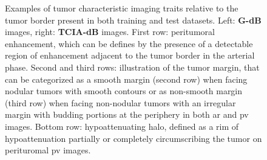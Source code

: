 \documentclass[]{article}
\newcommand{\lmttfont}[1]{{\fontfamily{lmtt}\selectfont #1}}
\begin{document}
\begin{figure}[!h]
\begin{minipage}{0.45\linewidth}
	\end{minipage}
	\caption{Examples of tumor characteristic imaging traits relative to the tumor border present in both training and test datasets. Left: \textbf{\lmttfont{G-dB}} images, right: \textbf{\lmttfont{TCIA-dB}} images. First row: peritumoral enhancement, which can be defines by the presence of a detectable region of enhancement adjacent to the tumor border in the arterial phase. Second and third rows: illustration of the tumor margin, that can be categorized as a smooth margin (second row) when facing nodular tumors with smooth contours or as non-smooth margin (third row) when facing non-nodular tumors with an irregular margin with budding portions at the periphery in both \ac{ar} and \ac{pv} images. Bottom row: hypoattenuating halo, defined as a rim of hypoattenuation partially or completely circumscribing the tumor on perituromal \ac{pv} images. }
	\label{fig:InterDb_imagingTraits}
\end{figure}
\end{document}
